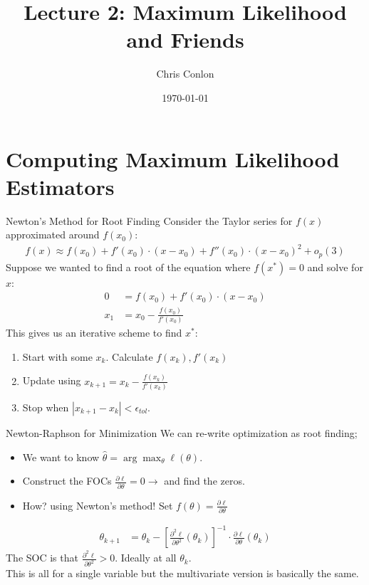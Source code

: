 

\title{Lecture 2: Maximum Likelihood and Friends}
\author{Chris Conlon }


\date{\today}


\maketitle


\section*{Computing Maximum Likelihood Estimators}

\begin{frame}{Newton's Method for Root Finding}
Consider the Taylor series for $f(x)$ approximated around $f(x_0)$:
\begin{align*}
f(x) \approx f(x_0) + f'(x_0) \cdot (x-x_0) + f''(x_0) \cdot (x-x_0)^2 + o_p(3)
\end{align*}
Suppose we wanted to find a \alert{root} of the equation where $f(x^{*})=0$ and solve for $x$:
\begin{align*}
0 &= f(x_0) + f'(x_0) \cdot (x-x_0) \\
x_1 &= x_0-\frac{f(x_0)}{f'(x_0)} 
\end{align*}
This gives us an \alert{iterative} scheme to find $x^{*}$:
\begin{enumerate}
\item Start with some $x_k$. Calculate $f(x_k),f'(x_k)$
\item Update using $x_{k+1} = x_k - \frac{f(x_k)}{f'(x_k)} $
\item Stop when $|x_{k+1}-x_{k}| < \epsilon_{tol}$.
\end{enumerate}
\end{frame}

\begin{frame}{Newton-Raphson for Minimization}
We can re-write \alert{optimization} as \alert{root finding};
\begin{itemize}
\item We want to know $\hat{\theta} = \arg \max_{\theta} \ell(\theta)$.
\item Construct the FOCs $\frac{\partial \ell}{\partial \theta}=0 \rightarrow$  and find the zeros.
\item How? using Newton's method! Set $f(\theta) = \frac{\partial \ell}{\partial \theta}$
\end{itemize}
\begin{align*}
\theta_{k+1} &= \theta_k -  \left[ \frac{\partial^2 \ell}{\partial \theta^2}(\theta_k) \right]^{-1} \cdot \frac{\partial \ell}{\partial \theta}(\theta_k)
\end{align*}
The SOC is that $ \frac{\partial^2 \ell}{\partial \theta^2} >0$. Ideally at all $\theta_k$.\\
This is all for a \alert{single variable} but the \alert{multivariate} version is basically the same.
\end{frame}


